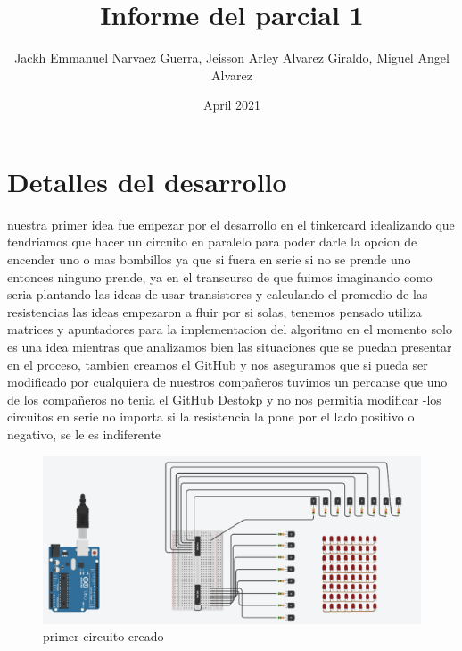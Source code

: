 \documentclass{article}
\title{Informe del parcial 1}
\author{Jackh Emmanuel Narvaez Guerra, Jeisson Arley Alvarez Giraldo, Miguel Angel Alvarez}
\date{April 2021}
\begin{document}
\maketitle

\section{Detalles del desarrollo}
nuestra primer idea fue empezar por el desarrollo en el tinkercard idealizando que tendriamos que hacer un circuito en paralelo para poder darle la opcion de encender uno o mas bombillos ya que si fuera en serie si no se prende uno entonces ninguno prende, ya en el transcurso de que fuimos imaginando como seria plantando las ideas de usar transistores y calculando el promedio de las resistencias las ideas empezaron a fluir por si solas, tenemos pensado utiliza matrices y apuntadores para la implementacion del algoritmo en el momento solo es una idea mientras que analizamos bien las situaciones que se puedan presentar en el proceso, tambien creamos el GitHub y nos aseguramos que si pueda ser modificado por cualquiera de nuestros compañeros tuvimos un percanse que uno de los compañeros no tenia el GitHub Destokp y no nos permitia modificar 
-los circuitos en serie no importa si la resistencia la pone por el lado positivo o negativo, se le es indiferente 

\begin{figure}[h!]
\centering
\includegraphics[scale=0.2]{imagen.png}
\caption{primer circuito creado}
\label{fig:universe}
\end{figure}
\end{document}
